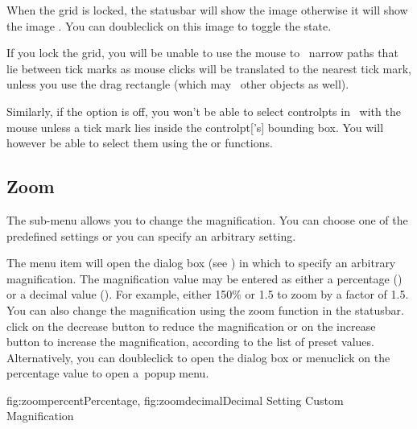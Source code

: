 When the grid is locked, the \gls{statusbar} will show the image
 otherwise it will show
the image .
You can \gls{doubleclick} on this image to toggle the state.

\begin{warning}
If you lock the grid, you will be unable to use the
mouse to \select\ narrow \glspl{path} that lie between tick marks as
mouse \glspl{click} will be translated to the nearest tick mark, unless you
use the drag rectangle (which may \select\ other \glspl{object} as well).
\end{warning}

Similarly, if the 
option is off, you won't be able to select \glspl{controlpt} in
\editpathmode\ with the mouse unless a
tick mark lies inside the \gls{controlpt}['s] bounding box.
You will however be able to select them using the
or  functions.


\subsection{Zoom}\label{sec:zoommenu}


The  sub-menu allows you to change
the magnification. You can choose one of the predefined
settings or you can specify an arbitrary setting.


The  menu item will open the
 dialog box (see ) in
which to specify an arbitrary magnification.  The magnification
value may be entered as either a percentage
() or a decimal value
(). For example, either 150\% or 1.5 to
zoom by a factor of 1.5.  You can also change the magnification
using the zoom function in the \gls{statusbar}. \Gls{click} on the
decrease button  to reduce the magnification or
on the increase button  to increase the
magnification, according to the list of preset values.
Alternatively, you can \gls{doubleclick} to open the 
dialog box or \gls{menuclick} on the percentage value to open
a~popup menu.

 {
   {fig:zoompercent}{}{Percentage},
   {fig:zoomdecimal}{}{Decimal}
 }
 {Setting Custom Magnification}

